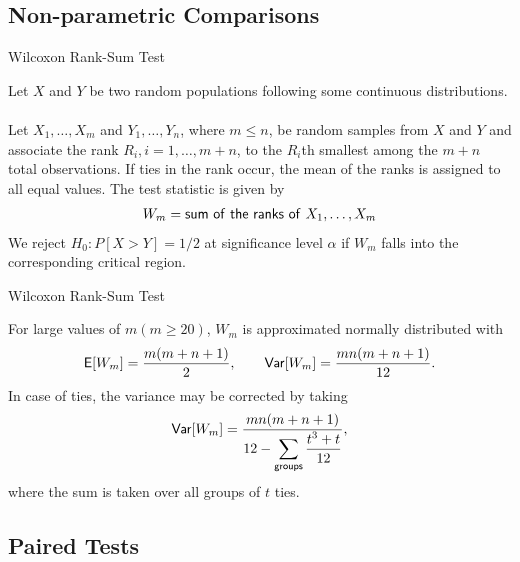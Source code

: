 \subsection{Non-parametric Comparisons}


\begin{frame}{Wilcoxon Rank-Sum Test}

\justifying
{} Let $X$ and $Y$ be two random populations following some continuous distributions. \\
~\\
Let $X_1, \ldots, X_m$ and $Y_1, \ldots, Y_n$, where $m\leq n$, be random samples from $X$ and $Y$ and associate the rank $R_i, i = 1,\ldots, m+n$, to the $R_i$th smallest among the $m+n$ total observations. If ties in the rank occur, the mean of the ranks is assigned to all equal values. The test statistic is given by
\begin{align*}
W_m = \mathsf{sum\ of\ the\ ranks\ of\ } X_1, \ldots, X_m
\end{align*}
We reject $H_0: P[X > Y] = 1/2$ at significance level $\alpha$ if $W_m$ falls into the corresponding critical region. 


\end{frame}


\begin{frame}{Wilcoxon Rank-Sum Test}

\justifying
{} For large values of $m (m\geq 20)$, $W_m$ is approximated normally distributed with
\begin{align*}
\mathsf{E}[W_m] = \frac{m(m+n+1)}{2}, \qquad \mathsf{Var}[W_m] = \frac{mn(m+n+1)}{12}.
\end{align*}
In case of ties, the variance may be corrected by taking
\begin{align*}
\mathsf{Var}[W_m] = \frac{mn(m+n+1)}{12-\displaystyle \sum_{\mathsf{groups}} \frac{t^3+t}{12}},
\end{align*}
where the sum is taken over all groups of $t$ ties.


\end{frame}



\subsection{Paired Tests}


